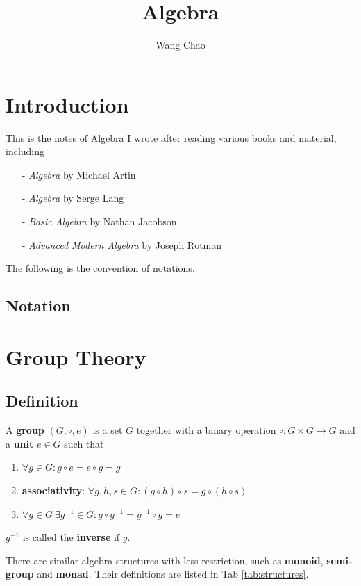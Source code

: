 \documentclass[12pt]{book}
\title{Algebra}
\author{Wang Chao}
\begin{document}
 

\maketitle 
\tableofcontents


	\chapter*{Introduction}
	This is the notes of  Algebra I wrote after reading various books and material, including
	\begin{itemize}
		\item[-] {\it Algebra} by Michael Artin
		\item[-] {\it Algebra} by Serge Lang
		\item[-] {\it Basic Algebra} by Nathan Jacobson
		\item[-] {\it Advanced Modern Algebra} by Joseph Rotman
	\end{itemize}
	
	The following is the convention of notations.	
	\section{Notation}
	
	\chapter{Group Theory}
	\section{Definition}
\begin{definition}
	A \textbf{group} $(G,\circ,e)$ is a set $G$ together with a binary operation $\circ:G\times G\rightarrow G$ and a {\bf unit} $e\in G$ such that
	\begin{enumerate}
		\item $\forall g\in G:g\circ e=e\circ g=g$
		\item \textbf{associativity}: $\forall g,h,s\in G:(g\circ h)\circ s=g\circ(h\circ s)$
		\item $\forall g\in G\ \exists g^{-1}\in G:g\circ g^{-1}=g^{-1}\circ g=e$
	\end{enumerate}
	$g^{-1}$ is called the \textbf{inverse} if $g$.
\end{definition}

	
	There are similar algebra structures with less restriction, such as \textbf{monoid}, \textbf{semi-group} and \textbf{monad}. Their definitions are listed in Tab \ref{tab:structures}.
	
\end{document}
